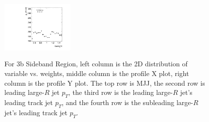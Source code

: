 \begin{figure}[htbp!]
\begin{center}
\includegraphics[width=0.32\textwidth,angle=-90]{figures/boosted/AppendixReweight/Weights/3Trk_Sideband_sublHCand_trk0_Pt_weight_profy.pdf}\\
\caption{For 3b Sideband Region, left column is the 2D distribution of variable vs. weights, middle column is the profile X plot, right column is the profile Y plot. The top row is MJJ, the second row is leading large-$R$ jet $p_{T}$, the third row is the leading large-$R$ jet's leading track jet $p_{T}$, and the fourth row is the subleading large-$R$ jet's leading track jet $p_{T}$.}
\label{fig:app-reweight-dist-3b-SB}
\end{center}
\end{figure}


